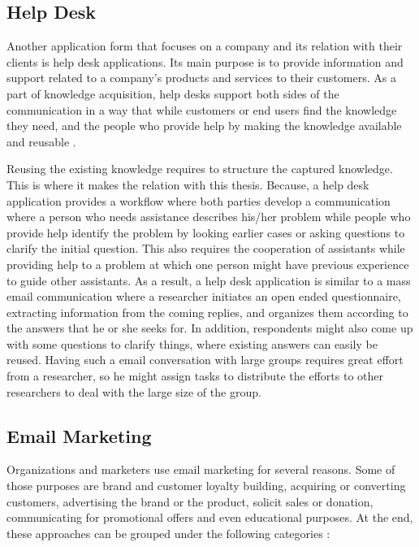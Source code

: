 \subsection{Help Desk}
\label{subsec:3.1.2:HelpDeskSoft}
Another application form that focuses on a company and its relation with their clients is help desk applications. Its main purpose is to provide information and support related to a company's products and services to their customers. As a part of knowledge acquisition, help desks support both sides of the communication in a way that while customers or end users find the knowledge they need, and the people who provide help by making the knowledge available and reusable \citep{Halverson2004}.
\vspace{1cm}

Reusing the existing knowledge requires to structure the captured knowledge. This is where it makes the relation with this thesis. Because, a help desk application provides a workflow where both parties develop a communication where a person who needs assistance describes his/her problem while people who provide help identify the problem by looking earlier cases or asking questions to clarify the initial question. This also requires the cooperation of assistants while providing help to a problem at which one person might have previous experience to guide other assistants. As a result, a help desk application is similar to a mass email communication where a researcher initiates an open ended questionnaire, extracting information from the coming replies, and organizes them according to the answers that he or she seeks for. In addition, respondents might also come up with some questions to clarify things, where existing answers can easily be reused. Having such a email conversation with large groups requires great effort from a researcher, so he might assign tasks to distribute the efforts to other researchers to deal with the large size of the group.


\subsection{Email Marketing}
\label{subsec:3.1.3:EmaiMarkt}
Organizations and marketers use email marketing for several reasons. Some of those purposes are brand and customer loyalty building, acquiring or converting customers, advertising the brand or the product, solicit sales or donation, communicating for promotional offers and even educational purposes. At the end, these approaches can be grouped under the following categories \cite{Eley2009}:

